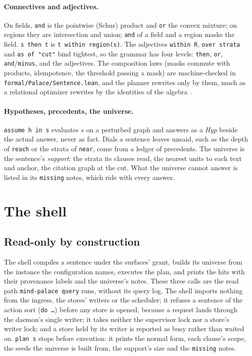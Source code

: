 \documentclass[11pt]{article}
\theoremstyle{plain}
\theoremstyle{definition}
\theoremstyle{remark}
\newcommand{\code}[1]{\texttt{#1}}
\begin{document}
\paragraph{Connectives and adjectives.} On fields, \code{and} is the pointwise (Schur) product and
\code{or} the convex mixture; on regions they are intersection and union; \code{and} of a field and
a region masks the field. \code{s then t} is \code{t within region(s)}. The adjectives
\code{within R}, \code{over strata} and \code{as of "cut"} bind tightest, so the grammar has four
levels: \code{then}, \code{or}, \code{and}/\code{minus}, and the adjectives. The composition laws
(masks commute with products, idempotence, the threshold passing a mask) are machine-checked in
\code{formal/Palace/Sentence.lean}, and the planner rewrites only by them, much as a relational
optimizer rewrites by the identities of the algebra \cite{codd1970relational}.

\paragraph{Hypotheses, precedents, the universe.} \code{assume h in s} evaluates $s$ on a
perturbed graph and answers as a \emph{Hyp} beside the actual answer, never as fact. Dials a
sentence leaves unsaid, such as the depth of \code{reach} or the strata of \code{near}, come from a
ledger of precedents. The universe is the sentence's \emph{support}: the strata its clauses read,
the nearest units to each text and anchor, the citation graph at the cut. What the universe cannot
answer is listed in its \code{missing} notes, which ride with every answer.

\section{The shell}

\subsection{Read-only by construction}
The shell compiles a sentence under the surfaces' grant, builds its universe from the instance
the configuration names, executes the plan, and prints the hits with their provenance labels and
the universe's notes. These three calls are the read path \code{mind-palace query} runs, without
its query log. The shell imports nothing from the ingress, the stores' writers or the scheduler;
it refuses a sentence of the action sort (\code{do \dots}) before any store is opened, because a
request lands through the daemon's single writer; it takes neither the supervisor lock nor a
store's writer lock; and a store held by its writer is reported as busy rather than waited on.
\code{plan s} stops before execution: it prints the normal form, each clause's scope, the seeds the
universe is built from, the support's size and the \code{missing} notes.
\end{document}
